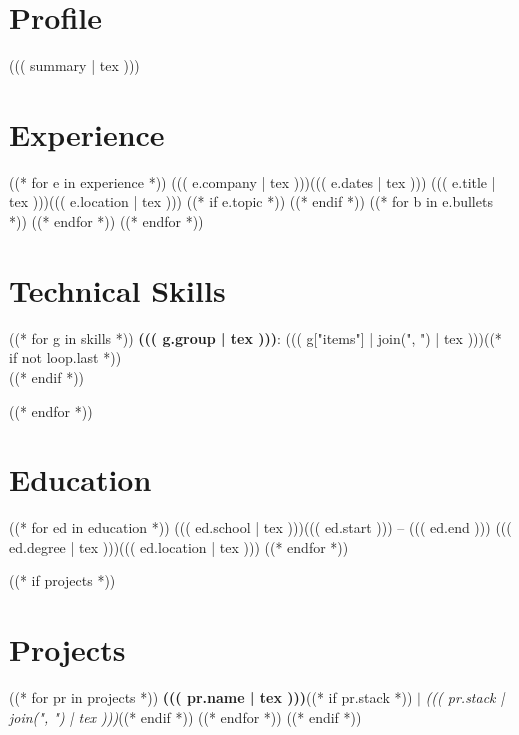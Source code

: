\documentclass[a4paper,11pt]{article}
\begin{document}
\cvheader

\section{Profile}
\small ((( summary | tex )))

\section{Experience}
  \resumeSubHeadingListStart
((* for e in experience *))
    \resumeSubheading
      {((( e.company | tex )))}{((( e.dates | tex )))}
      {((( e.title | tex )))}{((( e.location | tex )))}
      \resumeItemListStart
((* if e.topic *))
((* endif *))
((* for b in e.bullets *))
((* endfor *))
      \resumeItemListEnd
((* endfor *))
  \resumeSubHeadingListEnd

\section{Technical Skills}
 \begin{itemize}[leftmargin=0.15in, label={}]
    \small{\item{
((* for g in skills *))
     \textbf{((( g.group | tex )))}{: ((( g["items"] | join(", ") | tex )))}((* if not loop.last *)) \\((* endif *))

((* endfor *))
    }}
 \end{itemize}

\section{Education}
  \resumeSubHeadingListStart
((* for ed in education *))
    \resumeSubheading
      {((( ed.school | tex )))}{((( ed.start ))) -- ((( ed.end )))}
      {((( ed.degree | tex )))}{((( ed.location | tex )))}
((* endfor *))
  \resumeSubHeadingListEnd

((* if projects *))
\section{Projects}
    \resumeSubHeadingListStart
((* for pr in projects *))
      \resumeProjectHeading
          {\textbf{((( pr.name | tex )))}((* if pr.stack *)) $|$ \emph{((( pr.stack | join(", ") | tex )))}((* endif *))}{}
          \resumeItemListStart
          \resumeItemListEnd
((* endfor *))
    \resumeSubHeadingListEnd
((* endif *))
\end{document}
